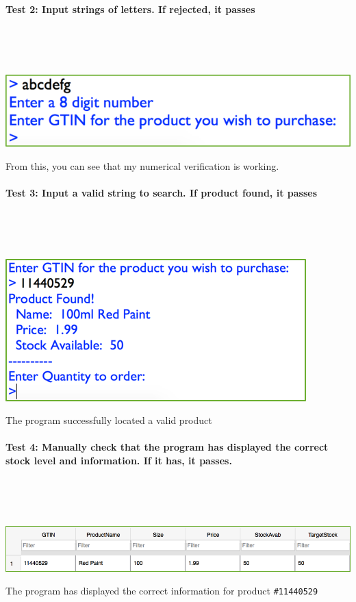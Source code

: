 \documentclass[a4paper]{article}
\begin{document}
\paragraph{Test 2: Input strings of letters. If rejected, it passes} ~\par ~\par
\noindent\includegraphics{testing_9.png} \par
From this, you can see that my numerical verification is working.
\paragraph{Test 3: Input a valid string to search. If product found, it passes} ~\par ~\par
\noindent\includegraphics{testing_10.png} \par
The program successfully located a valid product
\newpage
\paragraph{Test 4: Manually check that the program has displayed the correct stock level and information. If it has, it passes.} ~\par ~\par
\noindent\includegraphics{testing_11.png} \par
The program has displayed the correct information for product \verb|#11440529|
\end{document}
